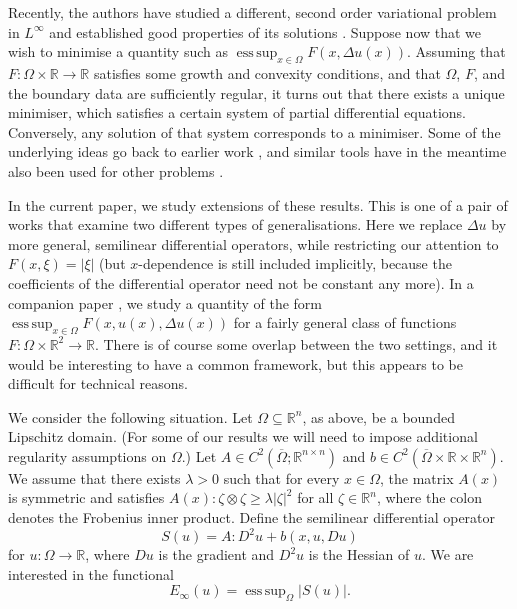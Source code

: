 \documentclass[a4paper]{article}
\newcommand{\R}{\mathbb{R}}
\DeclareMathOperator*{\esssup}{ess\,sup}
\theoremstyle{remark}
\begin{document}
Recently, the authors have studied a different, second order
variational problem in $L^\infty$ and established good properties of its solutions \cite{Katzourakis-Moser:19}. Suppose now that we wish to minimise
a quantity such as $\esssup_{x \in \Omega} F(x, \Delta u(x))$. Assuming
that $F \colon \Omega \times \R \to \R$ satisfies some
growth and convexity conditions, and that $\Omega$, $F$, and the boundary
data are sufficiently regular, it turns out that there exists a unique minimiser,
which satisfies a certain system of partial differential equations.
Conversely, any solution of that system corresponds to a minimiser.
Some of the underlying ideas go back to earlier work \cite{Moser-Schwetlick:12, Sakellaris:17},
and similar tools have in the meantime also been used for other problems
\cite{Katzourakis-Parini:17, Moser:19, Gallagher-Moser:22}.

In the current paper, we study extensions of these results. This is one of a
pair of works that examine two different types of generalisations.
Here we replace $\Delta u$ by more general, semilinear differential
operators, while restricting our attention to $F(x, \xi) = |\xi|$ (but
$x$-dependence is still included implicitly, because the coefficients
of the differential operator need not be constant any more). In a companion paper
\cite{Katzourakis-Moser:22}, we study a quantity of the form
$\esssup_{x \in \Omega} F(x, u(x), \Delta u(x))$
for a fairly general class of functions $F \colon \Omega \times \R^2 \to \R$.
There is of course some overlap between the two settings, and it would
be interesting to have a common framework, but this appears to be
difficult for technical reasons.

We consider the following situation. Let $\Omega \subseteq \R^n$, as above,
be a bounded Lipschitz domain. (For some of our results we will need to
impose additional regularity assumptions on $\Omega$.)
Let $A \in C^2(\overline{\Omega}; \R^{n \times n})$ and
$b \in C^2(\overline{\Omega} \times \R \times \R^n)$. We assume that
there exists $\lambda > 0$ such that for every $x \in \Omega$, the
matrix $A(x)$ is symmetric and satisfies $A(x) : \zeta \otimes \zeta \ge \lambda |\zeta|^2$ for all $\zeta \in \R^n$,
where the colon denotes the Frobenius inner product. Define the semilinear differential operator
\begin{equation} \label{eq:differential-operator}
S(u) = A : D^2 u + b(x, u, Du)
\end{equation}
for $u \colon \Omega \to \R$, where $Du$ is the gradient and $D^2 u$ is
the Hessian of $u$. We are interested in the functional
\[
E_\infty(u) = \esssup_\Omega |S(u)|.
\]
\end{document}
